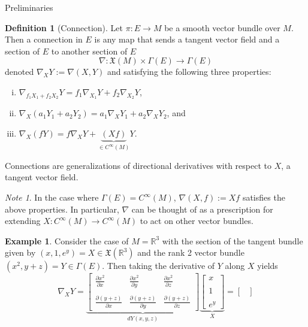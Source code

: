 \documentclass{article}
\newcommand{\fn}[3]{#1 \colon #2 \rightarrow #3}
\newcommand{\pd}[2]{\frac{\partial #1}{\partial #2}}
\theoremstyle{definition}
\newtheorem{definition}{Definition}[section]
\newtheorem{example}{Example}[section]
\theoremstyle{remark}
\newtheorem{remark}{Note}[section]
\begin{document}
\begin{section}{Preliminaries}
  \begin{definition}[Connection]
    Let $\fn \pi E M$ be a smooth vector bundle over $M$. Then a connection in
    $E$ is any map that sends a tangent vector field and a section of $E$ to
    another section of $E$ \[
      \fn{\nabla}{\mathfrak X(M) \times \Gamma(E)}{\Gamma(E)}
    \] denoted $\nabla_XY := \nabla(X, Y)$ and satisfying the following three properties:
    \begin{enumerate}[(i)]
      \item $\displaystyle\nabla_{f_1X_1 + f_2X_2}Y = f_1\nabla_{X_1}Y + f_2\nabla_{X_2}Y$,
      \item $\displaystyle\nabla_X(a_1Y_1 + a_2Y_2) = a_1\nabla_X Y_1 + a_2\nabla_XY_2$, and
      \item $\displaystyle\nabla_X(fY) = f\nabla_{X}Y + \underbrace{(Xf)}_{\in C^\infty(M)}Y$.
    \end{enumerate}
    Connections are generalizations of directional derivatives with respect to
    $X$, a tangent vector field.
  \end{definition}
  \begin{remark} %
    In the case where $\Gamma(E) = C^\infty(M)$, $\nabla(X, f) := Xf$ satisfies
    the above properties. In particular, $\nabla$ can be thought of as a
    prescription for extending $\fn X {C^\infty(M)}{C^\infty(M)}$ to act on other
    vector bundles.
  \end{remark}
  \begin{example}
    Consider the case of $M = \mathbb R^3$ with the section of the tangent
    bundle given by  $(x, 1, e^y) = X \in \mathfrak X(\mathbb R^3)$
    and the rank 2 vector bundle $(x^2, y + z) = Y \in \Gamma(E)$. Then taking
    the derivative of $Y$ along $X$ yields \[
      \nabla_XY = \underbrace{\begin{bmatrix}
        \displaystyle\pd{x^2}{x} & \displaystyle\pd{x^2}{y} & \displaystyle\pd{x^2}{z} \\
        \\
        \displaystyle\pd{(y+z)}{x} & \displaystyle\pd{(y + z)}{y} & \displaystyle\pd{(y + z)}{z}
      \end{bmatrix}}_{dY(x,y,z)}
      \underbrace{\begin{bmatrix}
        x \\~\\ 1 \\~\\ e^y
      \end{bmatrix}}_{X} =
      \begin{bmatrix}

\end{bmatrix}\]
\end{example}
\end{section}
\end{document}
